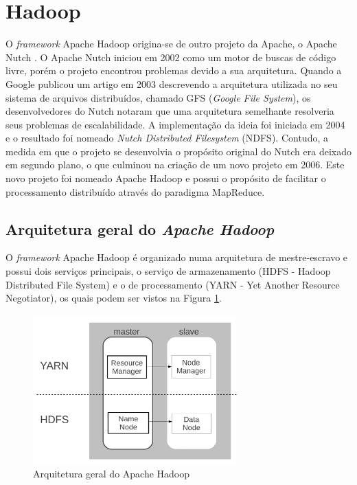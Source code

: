 
\section{Hadoop}
O \textit{framework} Apache Hadoop origina-se de outro projeto da Apache, o Apache Nutch \cite{Nutch}. O Apache Nutch iniciou em 2002 como um motor de buscas de código livre, porém o projeto encontrou problemas devido a sua arquitetura. Quando a Google publicou um artigo em 2003 descrevendo a arquitetura utilizada no seu sistema de arquivos distribuídos, chamado GFS (\textit{Google File System}), os desenvolvedores do Nutch notaram que uma arquitetura semelhante resolveria seus problemas de escalabilidade. A implementação da ideia foi iniciada em 2004 e o resultado foi nomeado \textit{Nutch Distributed Filesystem} (NDFS). Contudo, a medida em que o projeto se desenvolvia o propósito original do Nutch era deixado em segundo plano, o que culminou na criação de um novo projeto em 2006. Este novo projeto foi nomeado Apache Hadoop e possui o propósito de facilitar o processamento distribuído através do paradigma MapReduce.

\subsection{Arquitetura geral do \emph{Apache Hadoop}}
O \textit{framework} Apache Hadoop é organizado numa arquitetura de mestre-escravo e possui dois serviços principais, o serviço de armazenamento (HDFS - Hadoop Distributed File System) e o de processamento (YARN - Yet Another Resource Negotiator), os quais podem ser vistos na Figura \ref{fig:ArquiteturaHadoop}.

\begin{figure}[!ht]
\centering
\includegraphics[width=0.7\textwidth]{figuras/Figura08-HadoooArchGeral.png}
\caption{Arquitetura geral do Apache Hadoop}
\label{fig:ArquiteturaHadoop}
\end{figure}

